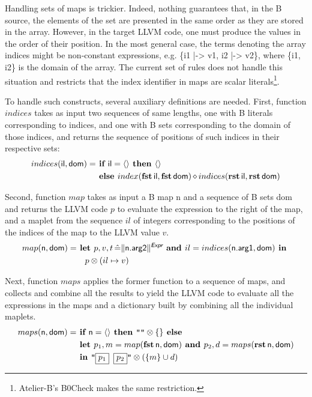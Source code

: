 \documentclass{article}
\newcommand{\trad}[2]{\ensuremath{\lVert \textsf{#1} \rVert^{\textit{#2}}}}
\DeclareMathOperator{\conc}{\diamond}
\newcommand{\llvm}[1]{\texttt{#1}}
\newcommand{\B}[1]{\textsf{#1}}
\newcommand{\IF}[0]{\textbf{ if }}
\newcommand{\ELSE}[0]{\textbf{ else }}
\newcommand{\THEN}[0]{\textbf{ then }}
\newcommand{\LET}[0]{\textbf{ let }}
\DeclareMathOperator{\BE}{\hat{=}}
\newcommand{\IN}[0]{\textbf{ in }}
\newcommand{\AND}[0]{\textbf{ and }}
\newcommand{\PH}[1]{\framebox{$#1$}}
\newcommand{\sep}[0]{\otimes}
\begin{document}
Handling sets of maps is trickier. Indeed, nothing guarantees that, in
the B source, the elements of the set are presented in the same order
as they are stored in the array. However, in the target LLVM code, one
must produce the values in the order of their position. In the most
general case, the terms denoting the array indices might be
non-constant expressions, e.g. \B{\{i1 |-> v1, i2 |-> v2\}}, where
\B{\{i1, i2\}} is the domain of the array. The current set of rules
does not handle this situation and restricts that the index identifier
in maps are scalar literals\footnote{Atelier-B's B0Check makes the same
  restriction.}. 

To handle such constructs, several auxiliary definitions are needed.
First, function $indices$ takes as input two sequences of same
lengths, one with B literals corresponding to indices, and one with B
sets corresponding to the domain of those indices, and returns
the sequence of positions of such indices in their respective sets:
\begin{align*}
indices(\B{il}, \B{dom}) =& \IF \B{il} = \langle \rangle \THEN \langle \rangle \\
& \ELSE index(\fst\, \B{il}, \fst\,\B{dom}) \conc indices(\rst\, \B{il}, \rst\, \B{dom})
\end{align*}

Second, function $map$ takes as input a B map \B{n} and a sequence of
B sets \B{dom} and returns the LLVM code $p$ to evaluate the
expression to the right of the map, and a maplet from the sequence
$il$ of integers corresponding to the positions of the indices of the
map to the LLVM value $v$.
\begin{align*}
map(\B{n}, \B{dom}) =& 
\LET p, v, t \BE \trad{n.arg2}{\B{Expr}} \AND il = indices(\B{n.arg1}, \B{dom}) \IN \\
& \quad p \sep (il \mapsto v)
\end{align*}

Next, function $maps$ applies the former function to a sequence of
maps, and collects and combine all the results to yield the LLVM code
to evaluate all the expressions in the maps and a dictionary built by
combining all the individual maplets.
\begin{align*}
maps(\B{n}, \B{dom}) =& \IF \B{n} = \langle \rangle \THEN \llvm{""} \sep \{\} \ELSE \\
& \LET p_1, m = map(\fst\, \B{n}, \B{dom}) \AND
p_2, d = maps(\rst\, \B{n}, \B{dom}) \\
& \IN \llvm{"\PH{p_1} \PH{p_2}"} \sep (\{ m \} \cup d)
\end{align*}
\end{document}
